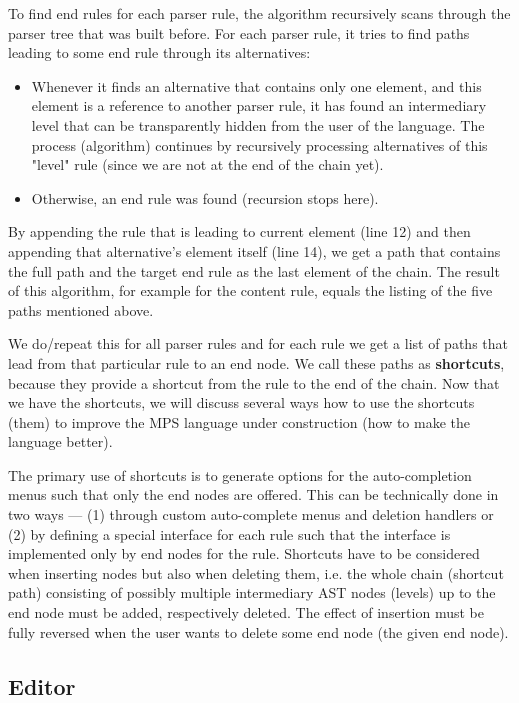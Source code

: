 \documentclass[10pt]{sigplanconf}
\newcommand{\antlrparserrule}[1]{\textcolor{antlrparserrulecolor}{#1}}
\begin{document}
To find end rules for each parser rule, the algorithm recursively scans through the parser tree that was built before.
For each parser rule, it tries to find paths leading to some end rule through its alternatives:
\begin{itemize}
	\item Whenever it finds an alternative that contains only one element, and this element is a reference to another parser rule, it has found an intermediary level that can be transparently hidden from the user of the language.
		The process (algorithm) continues by recursively processing alternatives of this "level" rule (since we are not at the end of the chain yet).
	\item Otherwise, an end rule was found (recursion stops here).
\end{itemize}

By appending the rule that is leading to current element (line 12) and then appending that alternative's element itself (line 14), we get a path that contains the full path and the target end rule as the last element of the chain.
The result of this algorithm, for example for the \antlrparserrule{content} rule, equals the listing of the five paths mentioned above.

We do/repeat this for all parser rules and for each rule we get a list of paths that lead from that particular rule to an end node.
We call these paths as \textbf{shortcuts}, because they provide a shortcut from the rule to the end of the chain.
Now that we have the shortcuts, we will discuss several ways how to use the shortcuts (them) to improve the MPS language under construction (how to make the language better).

The primary use of shortcuts is to generate options for the auto-completion menus such that only the end nodes are offered.
This can be technically done in two ways --- (1) through custom auto-complete menus and deletion handlers or (2) by defining a special interface for each rule such that the interface is implemented only by end nodes for the rule.
Shortcuts have to be considered when inserting nodes but also when deleting them, i.e. the whole chain (shortcut path) consisting of possibly multiple intermediary AST nodes (levels) up to the end node must be added, respectively deleted.
The effect of insertion must be fully reversed when the user wants to delete some end node (the given end node).

\subsection{Editor}
\end{document}
